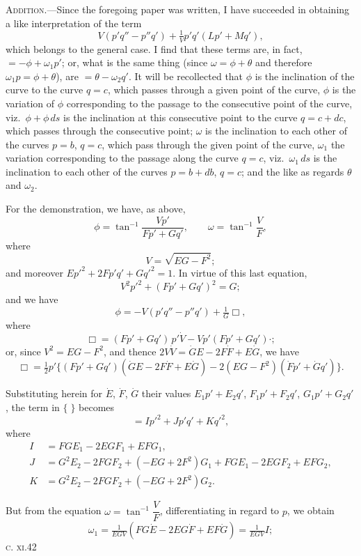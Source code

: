 \documentclass[11pt,a4paper]{article}
\begin{document}
\bigskip\noindent
\textsc{Addition.}---Since the foregoing paper was written, I have
succeeded in obtaining a like interpretation of the term
\[
  V(p'q''-p''q')+\tfrac{1}{V}p'q'(Lp'+Mq'),
\]
which belongs to the general case. I find that these terms are, in fact,
$=-\phi+\omega_{1}p'$; or, what is the same thing (since
$\omega=\phi+\theta$ and therefore $\omega_{1}p=\phi+\theta$), are
$=\theta-\omega_{2}q'$. It will be recollected that $\phi$ is the
inclination of the curve to the curve $q=c$, which passes through a
given point of the curve, $\phi$ is the variation of $\phi$
corresponding to the passage to the consecutive point of the curve,
viz.\ $\phi+\phi\,ds$ is the inclination at this consecutive point to
the curve $q=c+dc$, which passes through the consecutive point;
$\omega$ is the inclination to each other of the curves $p=b$, $q=c$,
which pass through the given point of the curve, $\omega_{1}$ the
variation corresponding to the passage along the curve $q=c$, viz.\
$\omega_{1}\,ds$ is the inclination to each other of the curves
$p=b+db$, $q=c$; and the like as regards $\theta$ and $\omega_{2}$.

For the demonstration, we have, as above,
\[
  \phi=\tan^{-1}\frac{Vp'}{Fp'+Gq'},\qquad \omega=\tan^{-1}\frac{V}{F},
\]
where
\[
  V=\sqrt{EG-F^{2}};
\]
and moreover $Ep'^{2}+2Fp'q'+Gq'^{2}=1$. In virtue of this last equation,
\[
  V^{2}p'^{2}+(Fp'+Gq')^{2}=G;
\]
and we have
\[
  \phi=-V(p'q''-p''q')+\tfrac{1}{G}\Box,
\]
where
\[
  \Box=(Fp'+Gq')\,p'\dot V-Vp'(Fp'+Gq')\cdot;
\]
or, since $V^{2}=EG-F^{2}$, and thence $2V\dot V=\dot GE-2F\dot F+E\dot G$, we have
\[
  \Box=\tfrac{1}{2}p'\{(Fp'+Gq')(\dot GE-2F\dot F+E\dot G)-2(EG-F^{2})(\dot Fp'+\dot Gq')\}.
\]

Substituting herein for $\dot E$, $\dot F$, $\dot G$ their values
$E_{1}p'+E_{2}q'$, $F_{1}p'+F_{2}q'$, $G_{1}p'+G_{2}q'$, the term
in $\{\;\}$ becomes
\[
  =Ip'^{2}+Jp'q'+Kq'^{2},
\]
where
\begin{align*}
  I &= FGE_{1}-2EGF_{1}+EFG_{1},\\
  J &= G^{2}E_{2}-2FGF_{2}+(-EG+2F^{2})G_{1}+FGE_{1}-2EGF_{2}+EFG_{2},\\
  K &= G^{2}E_{2}-2FGF_{2}+(-EG+2F^{2})G_{2}.
\end{align*}

But from the equation $\omega=\tan^{-1}\dfrac{V}{F}$, differentiating in regard to $p$, we obtain
\[
  \omega_{1}=\tfrac{1}{EGV}(FG\dot E-2EG\dot F+EF\dot G)=\tfrac{1}{EGV}I;
\]
\vfill\hfill\textsc{c. xi.}\hfill 42
\end{document}

